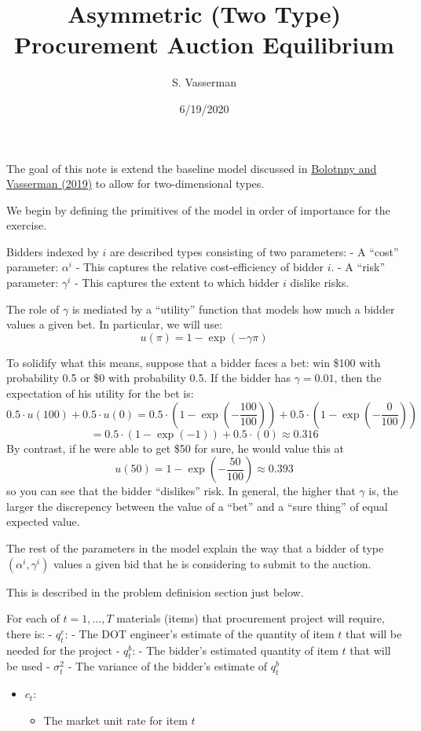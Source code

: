 \documentclass[
]{article}
\title{Asymmetric (Two Type) Procurement Auction Equilibrium}
\author{S. Vasserman}
\date{6/19/2020}
\providecommand{\tightlist}{%
  \setlength{\itemsep}{0pt}\setlength{\parskip}{0pt}}
\begin{document}
\maketitle

The goal of this note is extend the baseline model discussed in
\href{https://scholar.harvard.edu/files/vasserman/files/bv_sept2019.pdf}{Bolotnny
and Vasserman (2019)} to allow for two-dimensional types.

We begin by defining the primitives of the model in order of importance
for the exercise.

Bidders indexed by \(i\) are described types consisting of two
parameters: - A ``cost'' parameter: \(\alpha^i\) - This captures the
relative cost-efficiency of bidder \(i\). - A ``risk'' parameter:
\(\gamma^i\) - This captures the extent to which bidder \(i\) dislike
risks.

The role of \(\gamma\) is mediated by a ``utility'' function that models
how much a bidder values a given bet. In particular, we will use:
\[ u(\pi) = 1 - \exp(-\gamma \pi) \]

To solidify what this means, suppose that a bidder faces a bet: win
\$100 with probability 0.5 or \$0 with probability 0.5. If the bidder
has \(\gamma = 0.01\), then the expectation of his utility for the bet
is:
\[ 0.5 \cdot u(100) + 0.5 \cdot u(0) = 0.5 \cdot (1 - \exp(-\frac{100}{100})) + 0.5 \cdot (1 - \exp(-\frac{0}{100}))
\] \[ = 0.5 \cdot (1 - \exp(-1)) + 0.5 \cdot (0) \approx 0.316
\] By contrast, if he were able to get \$50 for sure, he would value
this at \[ u(50) = 1 - \exp(-\frac{50}{100}) \approx 0.393
\] so you can see that the bidder ``dislikes'' risk. In general, the
higher that \(\gamma\) is, the larger the discrepency between the value
of a ``bet'' and a ``sure thing'' of equal expected value.

The rest of the parameters in the model explain the way that a bidder of
type \((\alpha^i, \gamma^i)\) values a given bid that he is considering
to submit to the auction.

This is described in the problem definision section just below.

For each of \(t = 1, \ldots, T\) materials (items) that procurement
project will require, there is: - \(q_t^e\): - The DOT engineer's
estimate of the quantity of item \(t\) that will be needed for the
project - \(q_t^b\): - The bidder's estimated quantity of item \(t\)
that will be used - \(\sigma_t^2\) - The variance of the bidder's
estimate of \(q_t^b\)

\begin{itemize}
\tightlist
\item
  \(c_t\):

  \begin{itemize}
  \tightlist
  \item
    The market unit rate for item \(t\)
  \end{itemize}
\end{itemize}
\end{document}
